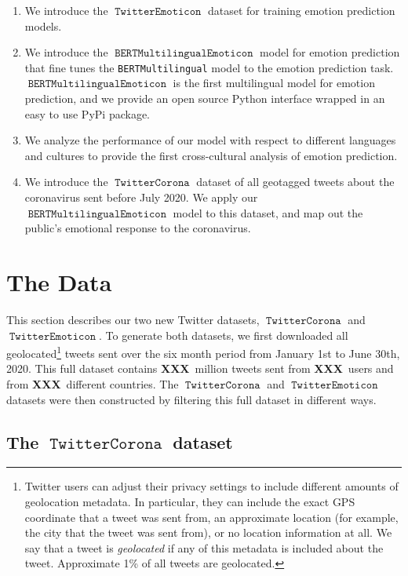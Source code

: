 \documentclass[11pt]{article}
\newcommand{\defn}[1]{\emph{{#1}}}
\newcommand{\XXX}{\textbf{XXX}~}
\DeclareMathOperator{\model}{\texttt{BERTMultilingualEmoticon}}
\DeclareMathOperator{\emoticon}{\texttt{TwitterEmoticon}}
\DeclareMathOperator{\corona}{\texttt{TwitterCorona}}
\begin{document}
\begin{enumerate}
    \item 
        We introduce the $\emoticon$ dataset for training emotion prediction models.
    \item
        We introduce the $\model$ model for emotion prediction that fine tunes the \texttt{BERTMultilingual} model \citep{devlin2018bert} to the emotion prediction task. 
        $\model$ is the first multilingual model for emotion prediction,
        and we provide an open source Python interface wrapped in an easy to use PyPi package.
    \item
        We analyze the performance of our model with respect to different languages and cultures to provide the first cross-cultural analysis of emotion prediction.
    \item 
        We introduce the $\corona$ dataset of all geotagged tweets about the coronavirus sent before July 2020.
        We apply our $\model$ model to this dataset,
        and map out the public's emotional response to the coronavirus.
\end{enumerate}

\section{The Data}
\label{sec:data}

This section describes our two new Twitter datasets, $\corona$ and $\emoticon$.
To generate both datasets,
we first downloaded all geolocated\footnote{%
Twitter users can adjust their privacy settings to include different amounts of geolocation metadata.
In particular, they can include the exact GPS coordinate that a tweet was sent from,
an approximate location (for example, the city that the tweet was sent from),
or no location information at all.
We say that a tweet is \defn{geolocated} if any of this metadata is included about the tweet.
Approximate 1\% of all tweets are geolocated.
} 
tweets sent over the six month period from January 1st to June 30th, 2020.
This full dataset contains \XXX million tweets sent from \XXX users and from \XXX different countries.
The $\corona$ and $\emoticon$ datasets were then constructed by filtering this full dataset in different ways.

\subsection {The $\corona$ dataset}
\end{document}
